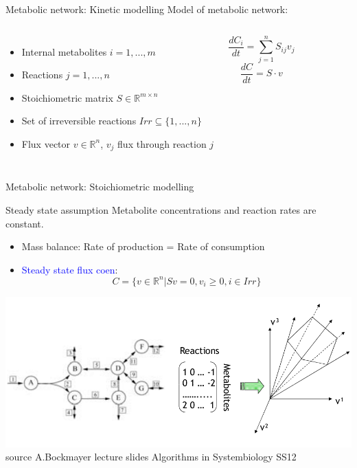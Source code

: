 \documentclass{beamer}
\begin{document}
\begin{frame}{Metabolic network: Kinetic modelling}
	Model of metabolic network:
\begin{columns}
	\begin{itemize}
		\item Internal metabolites $i = 1, ..., m$ 
		\item Reactions $j = 1, ..., n$
		\item Stoichiometric matrix $S \in \mathbb{R}^{m\times n}$
		\item Set of irreversible reactions $Irr \subseteq \{1, ..., n\}$
		\item Flux vector $v \in \mathbb{R}^{n}$, $v_j$ flux through reaction $j$
	\end{itemize}
    \pause
    $$\frac{dC_{i}}{dt} = \sum_{j=1}^{n} S_{ij} v_{j} $$
    $$\frac{dC}{dt} = S \cdot v$$
\end{columns}

\end{frame}
\begin{frame}{Metabolic network: Stoichiometric modelling}
    \begin{block}{Steady state assumption}
        Metabolite concentrations and reaction rates are constant.
    \end{block}
    \begin{itemize}
        \item Mass balance: Rate of production = Rate of consumption
        \item \textcolor{blue}{Steady state flux coen}:
    $$C = \{v \in \mathbb{R}^n | Sv = 0, v_i \geq 0, i \in Irr \}$$
    \end{itemize}
    \includegraphics[width=\textwidth]{grafik/modelling} \\
    \hfill \tiny{source A.Bockmayer lecture slides Algorithms in Systembiology SS12}
\end{frame}
\end{document}
